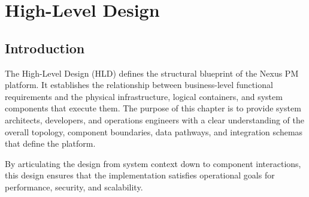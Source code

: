 \chapter{High-Level Design}
\label{chap:high-level-design}

\section{Introduction}
The High-Level Design (HLD) defines the structural blueprint of the Nexus PM platform. It establishes the relationship between business-level functional requirements and the physical infrastructure, logical containers, and system components that execute them. The purpose of this chapter is to provide system architects, developers, and operations engineers with a clear understanding of the overall topology, component boundaries, data pathways, and integration schemas that define the platform.

By articulating the design from system context down to component interactions, this design ensures that the implementation satisfies operational goals for performance, security, and scalability.

